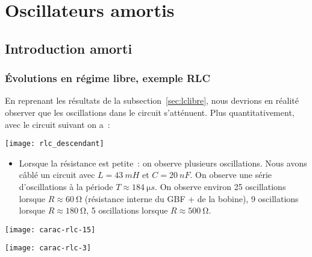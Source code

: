 \documentclass[../../main/main.tex]{subfiles}
\begin{document}
\section{Oscillateurs amortis}
\subsection{Introduction amorti}

\subsubsection{Évolutions en régime libre, exemple RLC}

\begin{minipage}{0.60\linewidth}
	En reprenant les résultats de la subsection~\ref{sec:lclibre}, nous devrions en
	réalité observer que les oscillations dans le circuit s’atténuent. Plus
	quantitativement, avec le circuit suivant on a~:
\end{minipage}
\begin{minipage}{0.40\linewidth}
	\begin{center}
		\texttt{[image: rlc\_descendant]}
	\end{center}
\end{minipage}

\begin{itemize}
	\item Lorsque la résistance est petite~: on observe plusieurs oscillations.
	      Nous avons câblé un circuit avec $L = \SI{43}{mH}$ et $C = \SI{20}{nF}$.
	      On observe une série d’oscillations à la période $T \approx \SI{184}{\micro
			      s}$. On observe environ 25 oscillations lorsque $R \approx
		      \SI{60}{\ohm}$ (résistance interne du GBF + de la bobine), 9
	      oscillations lorsque $R \approx \SI{180}{\ohm}$, 5 oscillations lorsque
	      $R \approx \SI{500}{\ohm}$.
\end{itemize}
\begin{minipage}{0.45\linewidth}
	\begin{center}
		\texttt{[image: carac-rlc-15]}
	\end{center}
\end{minipage}
\hfill
\begin{minipage}{0.45\linewidth}
	\begin{center}
		\texttt{[image: carac-rlc-3]}
	\end{center}
\end{minipage}
\end{document}
